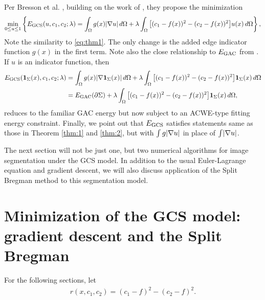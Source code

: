 Per Bresson et al. \cite{bresson2007fast}, building on the work of \cite{chan2006algorithms}, they propose the minimization 
\begin{align}
\min_{0\leq u \leq 1} \left\{
E_\textrm{GCS}(u, c_1, c_2; \lambda) 
= 
\int_{\Omega} g(x)  \lvert\nabla u\rvert \,d\Omega 
+ \lambda\int_{\Omega} \big[ (c_1 - f(x) )^2 - (c_2 - f(x))^2 \big] u(x) \,d\Omega
\right\},
\label{eq:min_gcs}
\end{align}
Note the similarity to \eqref{eq:thm1}. The only change is the added edge indicator function $g(x)$ in the first term. Note also the close relationship to $E_\textrm{GAC}$ from . If $u$ is an indicator function, then 
\begin{align*}
E_\textrm{GCS}(\mathbf{1}_\Sigma(x), c_1, c_2; \lambda) 
&= \int_{\Omega} g(x)  \lvert\nabla \mathbf{1}_\Sigma(x)\rvert \,d\Omega 
+ \lambda\int_{\Omega} \big[ (c_1 - f(x) )^2 - (c_2 - f(x))^2 \big] \mathbf{1}_\Sigma(x) \,d\Omega
\\
&= E_\textrm{GAC}(\partial \Sigma) +  \lambda\int_{\Omega} \big[ (c_1 - f(x) )^2 - (c_2 - f(x))^2 \big] \mathbf{1}_\Sigma(x) \,d\Omega,
\end{align*}
reduces to the familiar GAC energy but now subject to an ACWE-type fitting energy constraint. Finally, we point out that $E_\textrm{GCS}$ satisfies statements same as those in Theorem \ref{thm:1} and \ref{thm:2}, but with $\int g\lvert\nabla u\rvert$ in place of $\int \lvert\nabla u\rvert$.

The next section will not be just one, but two numerical algorithms for image segmentation under the GCS model. In addition to the usual Euler-Lagrange equation and gradient descent, we will also discuss application of the Split Bregman method \cite{goldstein2010geometric,goldstein2009split} to this segmentation model.

\section{Minimization of the GCS model: gradient descent and the Split Bregman}
For the following sections, let 
\begin{align*}
r(x, c_1, c_2) = (c_1 - f)^2 - (c_2 - f)^2.
\end{align*}

